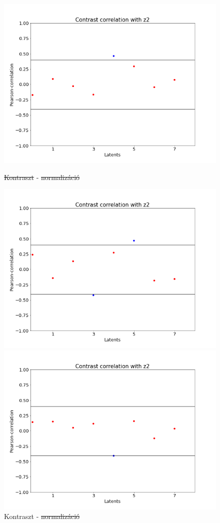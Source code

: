 \documentclass[12pt, english]{article}
\begin{document}
\begin{figure}[H] 
  \label{fig:contrast-correlation} 
  \begin{minipage}{0.5\linewidth}
    \centering
    \includegraphics[width=.72\linewidth]{contrast_to_latent/no_norm_contrast_z2_corr.png} 
    \caption{\st{Kontraszt} - \st{normalizáció}} 
    \label{fig:no-contrast-no-norm}
  \end{minipage}%
  \begin{minipage}{0.5\linewidth}
    \centering
    \includegraphics[width=.72\linewidth]{contrast_to_latent/no_norm_contrast_contrast_z2_corr.png} 
    \caption{Kontraszt - \st{normalizáció}} 
    \label{fig:contrast-no-norm}
  \end{minipage} 
  \begin{minipage}{0.5\linewidth}
    \centering
    \includegraphics[width=.72\linewidth]{contrast_to_latent/norm_no_contrast_correlation.png} 

\end{minipage}
\end{figure}
\end{document}
